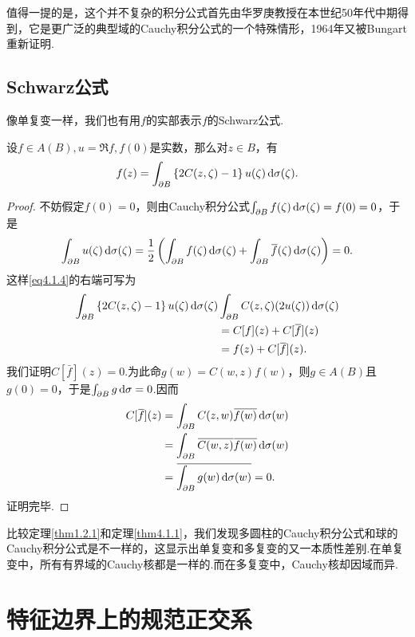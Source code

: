 值得一提的是，这个并不复杂的积分公式首先由华罗庚教授\cite{华罗庚1958多复变数函数论中的典型域的调和分析}在本世纪50年代中期得到，它是更广泛的典型域的Cauchy积分公式的一个特殊情形，1964年又被Bungart\cite{bungart1964boundary}重新证明.
\subsection{Schwarz公式}
像单复变一样，我们也有用$f$的实部表示$f$的Schwarz公式.
\begin{theorem}\label{thm4.1.2}
	设$f\in A(B),u=\Re f,f(0)$是实数，那么对$z\in B$，有
	\begin{equation}\label{eq4.1.4}
		f(z)=\int_{\partial B}\left\{2C(z,\zeta)-1\right\}u(\zeta)\mathop{}\!\mathrm{d}\sigma(\zeta).
	\end{equation}
\end{theorem}
\begin{proof}
	不妨假定$f(0)=0$，则由Cauchy积分公式$\int_{\partial B}f(\zeta)\mathop{}\!\mathrm{d}\sigma(\zeta)=f(0)=0$，于是
	\[\int_{\partial B}u(\zeta)\mathop{}\!\mathrm{d}\sigma(\zeta)=\frac12\left(\int_{\partial B}f(\zeta)\mathop{}\!\mathrm{d}\sigma(\zeta)+\int_{\partial B}{}\mkern1mu\overline{\mkern-1muf}(\zeta)\mathop{}\!\mathrm{d}\sigma(\zeta)\right)=0.\]
	这样\eqref{eq4.1.4}的右端可写为
	\begin{align*}
		\int_{\partial B}\left\{2C(z,\zeta)-1\right\}u(\zeta)\mathop{}\!\mathrm{d}\sigma(\zeta)
		&\int_{\partial B}C(z,\zeta)(2u(\zeta))\mathop{}\!\mathrm{d}\sigma(\zeta)\\
		&=C[f](z)+C[{}\mkern1mu\overline{\mkern-1muf}](z)\\
		&=f(z)+C[{}\mkern1mu\overline{\mkern-1muf}](z).
	\end{align*}
我们证明$C[\bar{f}](z)=0$.为此命$g(w)=C(w,z)f(w)$，则$g\in A(B)$且$g(0)=0$，于是$\int_{\partial B}g\mathop{}\!\mathrm{d}\sigma=0$.因而
\begin{align*}
	C[{}\mkern1mu\overline{\mkern-1muf}](z)
	&=\int_{\partial B} C(z,w){}\mkern1mu\overline{\mkern-1muf(w)}\mathop{}\!\mathrm{d}\sigma(w)\\
	&=\int_{\partial B}{}\mkern1mu\overline{\mkern-1muC(w,z)}{}\mkern1mu\overline{\mkern-1muf(w)}\mathop{}\!\mathrm{d}\sigma(w)\\
	&={}\mkern1mu\overline{\mkern-1mu\int_{\partial B}g(w)\mathop{}\!\mathrm{d}\sigma(w)}=0.
\end{align*}
证明完毕.
\end{proof}
比较定理\ref{thm1.2.1}和定理\ref{thm4.1.1}，我们发现多圆柱的Cauchy积分公式和球的Cauchy积分公式是不一样的，这显示出单复变和多复变的又一本质性差别.在单复变中，所有有界域的Cauchy核都是一样的.而在多复变中，Cauchy核却因域而异.
\section{特征边界上的规范正交系\label{sec4.2}}
